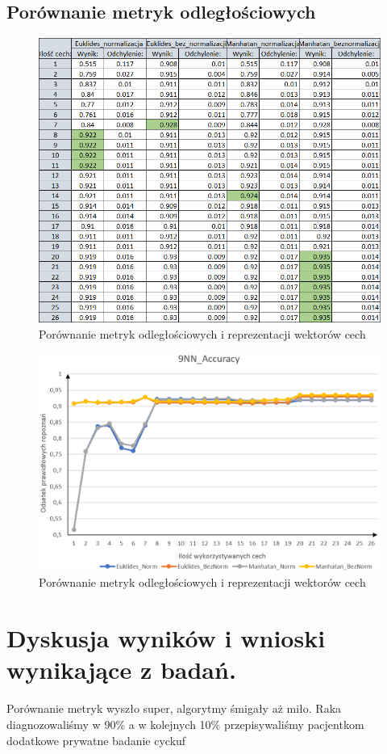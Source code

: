 \documentclass[12pt]{article}
\begin{document}
\subsection{Porównanie metryk odległościowych}
\begin{figure}[H]
	\centering
		\includegraphics[scale=0.77]{images/distance_metrics/distance_metrics_tab.png}
	\caption{Porównanie metryk odległościowych i reprezentacji wektorów cech}
\end{figure}
\begin{figure}[H]
	\centering
		\includegraphics[scale=0.66]{images/distance_metrics/distance_metrics.png}
	\caption{Porównanie metryk odległościowych i reprezentacji wektorów cech}
\end{figure}


\section{Dyskusja wyników i wnioski wynikające z badań.}

Porównanie metryk wyszło super, algorytmy śmigały aż miło. Raka diagnozowaliśmy w 90\% a w kolejnych 10\% przepisywaliśmy pacjentkom dodatkowe prywatne badanie cyckuf
\end{document}
